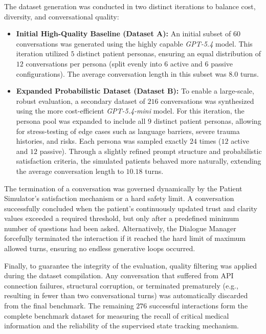 The dataset generation was conducted in two distinct iterations to balance cost, diversity, and conversational quality:
\begin{itemize}
    \item \textbf{Initial High-Quality Baseline (Dataset A):} An initial subset of $60$ conversations was generated using the highly capable \textit{GPT-5.4} model. This iteration utilized $5$ distinct patient personas, ensuring an equal distribution of $12$ conversations per persona (split evenly into $6$ active and $6$ passive configurations). The average conversation length in this subset was $8.0$ turns.
    \item \textbf{Expanded Probabilistic Dataset (Dataset B):} To enable a large-scale, robust evaluation, a secondary dataset of $216$ conversations was synthesized using the more cost-efficient \textit{GPT-5.4-mini} model. For this iteration, the persona pool was expanded to include all $9$ distinct patient personas, allowing for stress-testing of edge cases such as language barriers, severe trauma histories, and risks. Each persona was sampled exactly $24$ times ($12$ active and $12$ passive). Through a slightly refined prompt structure and probabilistic satisfaction criteria, the simulated patients behaved more naturally, extending the average conversation length to $10.18$ turns.
\end{itemize}

The termination of a conversation was governed dynamically by the Patient Simulator's satisfaction mechanism or a hard safety limit. 
A conversation successfully concluded when the patient's continuously updated trust and clarity values exceeded a required threshold, but only after a predefined minimum number of questions had been asked. 
Alternatively, the Dialogue Manager forcefully terminated the interaction if it reached the hard limit of maximum allowed turns, ensuring no endless generative loops occurred.

Finally, to guarantee the integrity of the evaluation, quality filtering was applied during the dataset compilation. 
Any conversation that suffered from API connection failures, structural corruption, or terminated prematurely (e.g., resulting in fewer than two conversational turns) was automatically discarded from the final benchmark. 
The remaining $276$ successful interactions form the complete benchmark dataset for measuring the recall of critical medical information and the reliability of the supervised state tracking mechanism.